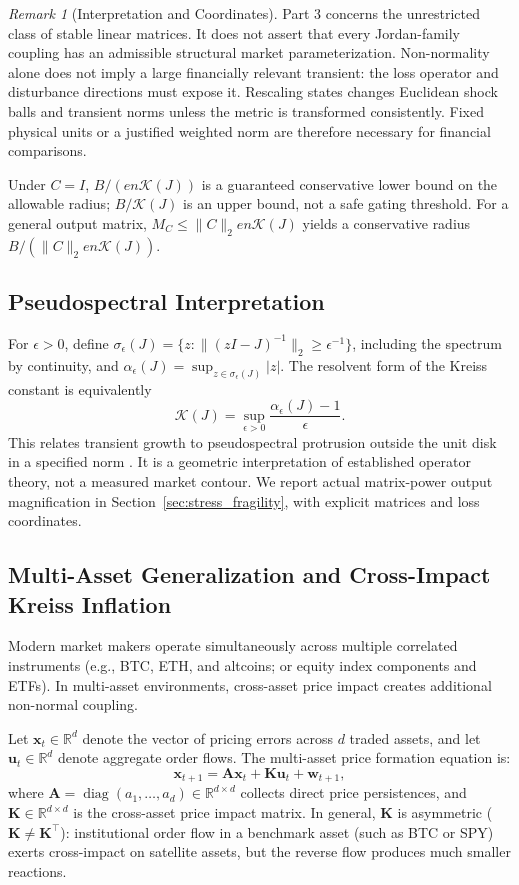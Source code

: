\documentclass[12pt]{article}
\theoremstyle{definition}
\theoremstyle{remark}
\newtheorem{remark}[theorem]{Remark}
\newcommand{\R}{\mathbb{R}}
\newcommand{\diag}{\operatorname{diag}}
\begin{document}
\begin{remark}[Interpretation and Coordinates]
Part 3 concerns the unrestricted class of stable linear matrices. It does not assert that every Jordan-family coupling has an admissible structural market parameterization. Non-normality alone does not imply a large financially relevant transient: the loss operator and disturbance directions must expose it. Rescaling states changes Euclidean shock balls and transient norms unless the metric is transformed consistently. Fixed physical units or a justified weighted norm are therefore necessary for financial comparisons.

Under $C=I$, $B/(en\mathcal K(J))$ is a guaranteed conservative lower bound on the allowable radius; $B/\mathcal K(J)$ is an upper bound, not a safe gating threshold. For a general output matrix, $M_C\le\|C\|_2 en\mathcal K(J)$ yields a conservative radius $B/(\|C\|_2 en\mathcal K(J))$.
\end{remark}

\subsection{Pseudospectral Interpretation}
For $\epsilon>0$, define $\sigma_\epsilon(J)=\{z:\|(zI-J)^{-1}\|_2\ge\epsilon^{-1}\}$, including the spectrum by continuity, and $\alpha_\epsilon(J)=\sup_{z\in\sigma_\epsilon(J)}|z|$. The resolvent form of the Kreiss constant is equivalently
\[
\mathcal K(J)=\sup_{\epsilon>0}\frac{\alpha_\epsilon(J)-1}{\epsilon}.
\]
This relates transient growth to pseudospectral protrusion outside the unit disk in a specified norm \citep{trefethen2005spectra}. It is a geometric interpretation of established operator theory, not a measured market contour. We report actual matrix-power output magnification in Section~\ref{sec:stress_fragility}, with explicit matrices and loss coordinates.

\subsection{Multi-Asset Generalization and Cross-Impact Kreiss Inflation}
Modern market makers operate simultaneously across multiple correlated instruments (e.g., BTC, ETH, and altcoins; or equity index components and ETFs). In multi-asset environments, cross-asset price impact creates additional non-normal coupling.

Let $\mathbf{x}_t \in \R^d$ denote the vector of pricing errors across $d$ traded assets, and let $\mathbf{u}_t \in \R^d$ denote aggregate order flows. The multi-asset price formation equation is:
\begin{equation}
\mathbf{x}_{t+1} = \mathbf{A} \mathbf{x}_t + \mathbf{K} \mathbf{u}_t + \mathbf{w}_{t+1},
\label{eq:multi_price}
\end{equation}
where $\mathbf{A} = \diag(a_1, \dots, a_d) \in \R^{d \times d}$ collects direct price persistences, and $\mathbf{K} \in \R^{d \times d}$ is the cross-asset price impact matrix. In general, $\mathbf{K}$ is asymmetric ($\mathbf{K} \neq \mathbf{K}^\top$): institutional order flow in a benchmark asset (such as BTC or SPY) exerts cross-impact on satellite assets, but the reverse flow produces much smaller reactions.
\end{document}
